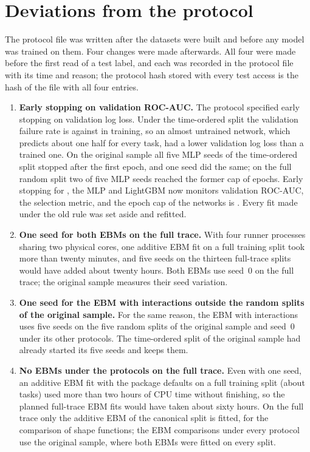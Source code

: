 \section{Deviations from the protocol}
\label{app:deviations}

The protocol file was written after the datasets were built and before any model was trained on them. Four changes were made afterwards. All four were made before the first read of a test label, and each was recorded in the protocol file with its time and reason; the protocol hash stored with every test access is the hash of the file with all four entries.

\begin{enumerate}
\item \textbf{Early stopping on validation ROC-AUC.} The protocol specified early stopping on validation log loss. Under the time-ordered split the validation failure rate is  against  in training, so an almost untrained network, which predicts about one half for every task, had a lower validation log loss than a trained one. On the original sample all five MLP seeds of the time-ordered split stopped after the first epoch, and one \kaam{} seed did the same; on the full random split two of five MLP seeds reached the former cap of  epochs. Early stopping for \kaam{}, the MLP and LightGBM now monitors validation ROC-AUC, the selection metric, and the epoch cap of the networks is . Every fit made under the old rule was set aside and refitted.
\item \textbf{One seed for both EBMs on the full trace.} With four runner processes sharing two physical cores, one additive EBM fit on a full training split took more than twenty minutes, and five seeds on the thirteen full-trace splits would have added about twenty hours. Both EBMs use seed~0 on the full trace; the original sample measures their seed variation.
\item \textbf{One seed for the EBM with interactions outside the random splits of the original sample.} For the same reason, the EBM with interactions uses five seeds on the five random splits of the original sample and seed~0 under its other protocols. The time-ordered split of the original sample had already started its five seeds and keeps them.
\item \textbf{No EBMs under the protocols on the full trace.} Even with one seed, an additive EBM fit with the package defaults on a full training split (about  tasks) used more than two hours of CPU time without finishing, so the planned full-trace EBM fits would have taken about sixty hours. On the full trace only the additive EBM of the canonical split is fitted, for the comparison of shape functions; the EBM comparisons under every protocol use the original sample, where both EBMs were fitted on every split.
\end{enumerate}

